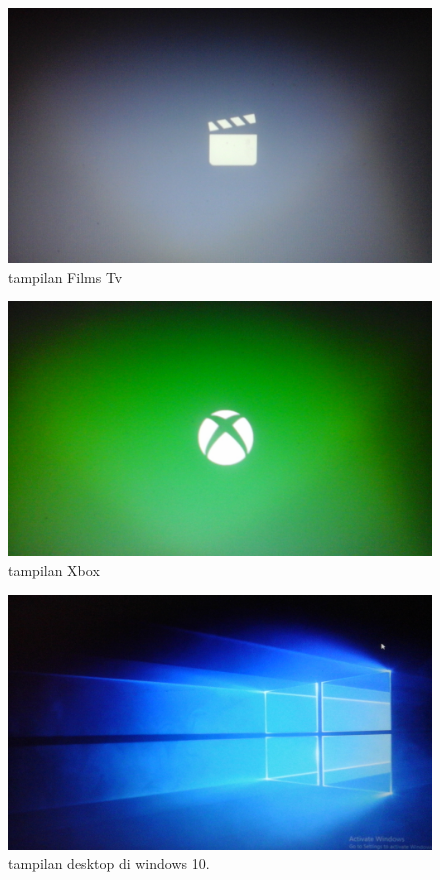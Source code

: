 \begin{figure}[ht]
\centerline{\includegraphics[width=1\textwidth]{figures/filmstv.jpg}}
\caption{tampilan Films Tv}
\label{filmstv}
\end{figure}

\begin{figure}[ht]
\centerline{\includegraphics[width=1\textwidth]{figures/Xbox.JPG}}
\caption{tampilan Xbox}
\label{Xbox}
\end{figure}

\begin{figure}[ht]
\centerline{\includegraphics[width=1\textwidth]{figures/tampilanwindows10.JPG}}
\caption{tampilan desktop di windows 10.}
\label{tampilanwindows10}
\end{figure}